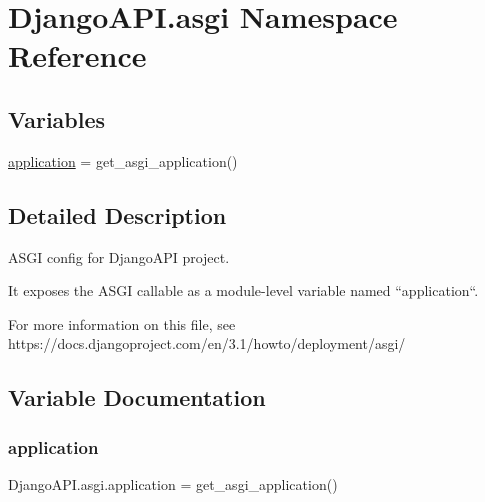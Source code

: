 \hypertarget{namespace_django_a_p_i_1_1asgi}{}\section{Django\+A\+P\+I.\+asgi Namespace Reference}
\label{namespace_django_a_p_i_1_1asgi}
\subsection*{Variables}
\begin{DoxyCompactItemize}
\item 
\hyperlink{namespace_django_a_p_i_1_1asgi_a28c32bdca4ff098b917a4bfea2fc993c}{application} = get\+\_\+asgi\+\_\+application()
\end{DoxyCompactItemize}


\subsection{Detailed Description}
\begin{DoxyVerb}ASGI config for DjangoAPI project.

It exposes the ASGI callable as a module-level variable named ``application``.

For more information on this file, see
https://docs.djangoproject.com/en/3.1/howto/deployment/asgi/
\end{DoxyVerb}
 

\subsection{Variable Documentation}
\mbox{\label{namespace_django_a_p_i_1_1asgi_a28c32bdca4ff098b917a4bfea2fc993c}} 
\subsubsection{\texorpdfstring{application}{application}}
{\footnotesize\ttfamily Django\+A\+P\+I.\+asgi.\+application = get\+\_\+asgi\+\_\+application()}

